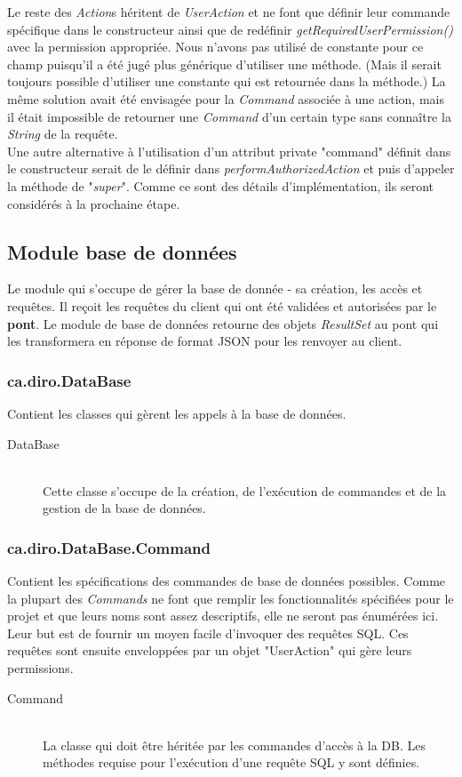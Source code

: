 \documentclass[10pt,a4paper]{report}
\begin{document}
\begin{flushleft}
\begin{description}
\end{description}
\bigskip
Le reste des \emph{Action}s héritent de \emph{UserAction} et ne font que définir leur commande spécifique dans le constructeur ainsi que de redéfinir \emph{getRequiredUserPermission()} avec la permission appropriée. Nous n'avons pas utilisé de constante pour ce champ puisqu'il a été jugé plus générique d'utiliser une méthode. (Mais il serait toujours possible d'utiliser une constante qui est retournée dans la méthode.) La même solution avait été envisagée pour la \emph{Command} associée à une action, mais il était impossible de retourner une \emph{Command} d'un certain type sans connaître la \emph{String} de la requête.\\
\medskip
Une autre alternative à l'utilisation d'un attribut private "command" définit dans le constructeur serait de le définir dans \emph{performAuthorizedAction} et puis d'appeler la méthode de "\emph{super}". Comme ce sont des détails d'implémentation, ils seront considérés à la prochaine étape.\\
\bigskip
\subsection*{Module base de données}
Le module qui s'occupe de gérer la base de donnée - sa création, les accès et requêtes. Il reçoit les requêtes du client qui ont été validées et autorisées par le \textbf{pont}. Le module de base de données retourne des objets \emph{ResultSet} au pont qui les transformera en réponse de format JSON pour les renvoyer au client.\\
\bigskip
\subsubsection*{ca.diro.DataBase}
Contient les classes qui gèrent les appels à la base de données.\\
\begin{description}
\item[DataBase] \hfill \\ Cette classe s'occupe de la création, de l'exécution de commandes et de la gestion de la base de données.
\end{description}
\bigskip
\subsubsection*{ca.diro.DataBase.Command}
Contient les spécifications des commandes de base de données possibles. Comme la plupart des \emph{Commands} ne font que remplir les fonctionnalités spécifiées pour le projet et que leurs noms sont assez descriptifs, elle ne seront pas énumérées ici. Leur but est de fournir un moyen facile d'invoquer des requêtes SQL. Ces requêtes sont ensuite enveloppées par un objet "UserAction" qui gère leurs permissions.\\
\begin{description}
\item[Command] \hfill \\ La classe qui doit être héritée par les commandes d'accès à la DB. Les méthodes requise pour l'exécution d'une requête SQL y sont définies.
\end{description}
\bigskip

\end{flushleft}
\end{document}
